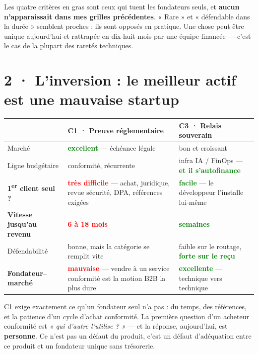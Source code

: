 \documentclass[10pt]{article}
\newcommand{\best}[1]{\textcolor{green}{\textbf{#1}}}
\newcommand{\pire}[1]{\textcolor{red}{\textbf{#1}}}
\begin{document}
Les quatre critères en gras sont ceux qui tuent les fondateurs seuls, et \textbf{aucun n'apparaissait
dans mes grilles précédentes}. « Rare » et « défendable dans la durée » semblent proches ; ils sont
opposés en pratique. Une chose peut être unique aujourd'hui et rattrapée en dix-huit mois par une
équipe financée --- c'est le cas de la plupart des raretés techniques.

\section{2 · L'inversion : le meilleur actif est une mauvaise startup}

\renewcommand{\arraystretch}{1.25}
\begin{center}\small
\begin{tabular}{@{}>{\raggedright\arraybackslash}p{3.4cm} >{\raggedright\arraybackslash}p{6.0cm} >{\raggedright\arraybackslash}p{6.0cm}@{}}
\toprule
& \textbf{C1 · Preuve réglementaire} & \textbf{C3 · Relais souverain} \\
\midrule
Marché & \best{excellent} --- échéance légale & bon et croissant \\
Ligne budgétaire & conformité, récurrente & infra IA / FinOps --- \best{et il s'autofinance} \\
\textbf{1\textsuperscript{er} client seul ?} & \pire{très difficile} --- achat, juridique, revue sécurité, DPA, références exigées & \best{facile} --- le développeur l'installe lui-même \\
\textbf{Vitesse jusqu'au revenu} & \pire{6 à 18 mois} & \best{semaines} \\
Défendabilité & bonne, mais la catégorie se remplit vite & faible sur le routage, \best{forte sur le reçu} \\
\textbf{Fondateur--marché} & \pire{mauvaise} --- vendre à un service conformité est la motion B2B la plus dure & \best{excellente} --- technique vers technique \\
\bottomrule
\end{tabular}
\end{center}

C1 exige exactement ce qu'un fondateur seul n'a pas : du temps, des références, et la patience d'un
cycle d'achat conformité. La première question d'un acheteur conformité est \emph{« qui d'autre
l'utilise ? »} --- et la réponse, aujourd'hui, est \textbf{personne}. Ce n'est pas un défaut du produit,
c'est un défaut d'adéquation entre ce produit et un fondateur unique sans trésorerie.
\end{document}
